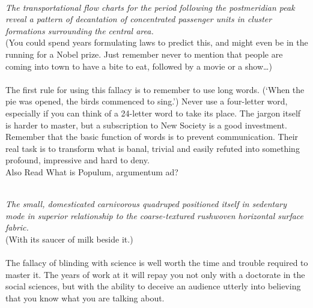 \documentclass[a4paper,12pt,single,pdftex]{scrartcl}
\begin{document}
    
       
    \\

    
      {\em The transportational flow charts for the period following the postmeridian peak reveal a pattern of decantation of concentrated passenger units in cluster formations surrounding the central area.}
    \\

    
      (You could spend years formulating laws to predict this, and might even be in the running for a Nobel prize. Just remember never to mention that people are coming into town to have a bite to eat, followed by a movie or a show…)
    \\

    
       
    \\

    
      The first rule for using this fallacy is to remember to use long words. (‘When the pie was opened, the birds commenced to sing.’) Never use a four-letter word, especially if you can think of a 24-letter word to take its place. The jargon itself is harder to master, but a subscription to New Society is a good investment. Remember that the basic function of words is to prevent communication. Their real task is to transform what is banal, trivial and easily refuted into something profound, impressive and hard to deny.
    \\

    
      

      
        Also Read  What is Populum, argumentum ad?
      
    
    
       
    \\

    
      {\em The small, domesticated carnivorous quadruped positioned itself in sedentary mode in superior relationship to the coarse-textured rushwoven horizontal surface fabric.}
    \\

    
      (With its saucer of milk beside it.)
    \\

    
       
    \\

    
      The fallacy of blinding with science is well worth the time and trouble required to master it. The years of work at it will repay you not only with a doctorate in the social sciences, but with the ability to deceive an audience utterly into believing that you know what you are talking about.
    \\
\end{document}
